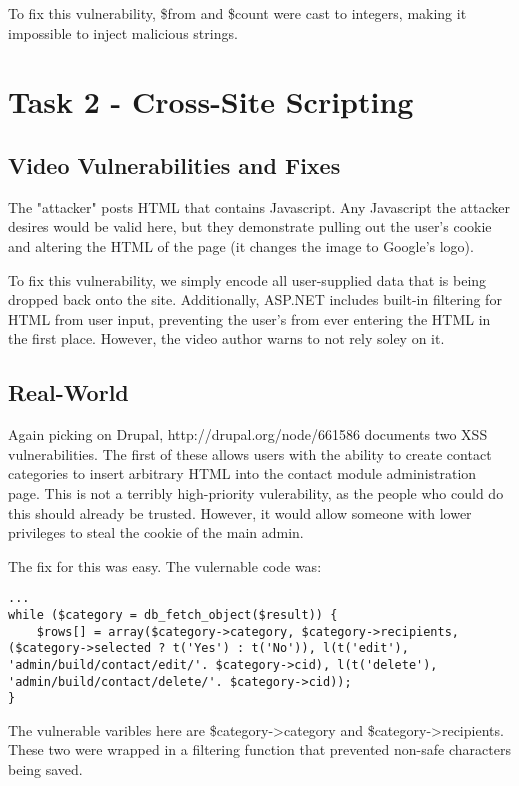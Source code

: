 \documentclass{article}
\begin{document}
\par To fix this vulnerability, \$from and \$count were cast to integers, making it impossible to inject malicious strings.

\section{Task 2 - Cross-Site Scripting}
\subsection{Video Vulnerabilities and Fixes}
\par The "attacker" posts HTML that contains Javascript. Any Javascript the attacker desires would be valid here, but they demonstrate pulling out the user's cookie and altering the HTML of the page (it changes the image to Google's logo).

\par To fix this vulnerability, we simply encode all user-supplied data that is being dropped back onto the site. Additionally, ASP.NET includes built-in filtering for HTML from user input, preventing the user's from ever entering the HTML in the first place. However, the video author warns to not rely soley on it.

\subsection{Real-World}
\par Again picking on Drupal, http://drupal.org/node/661586 documents two XSS vulnerabilities. The first of these allows users with the ability to create contact categories to insert arbitrary HTML into the contact module administration page. This is not a terribly high-priority vulerability, as the people who could do this should already be trusted. However, it would allow someone with lower privileges to steal the cookie of the main admin.

\par The fix for this was easy. The vulernable code was:
\begin{verbatim}
...
while ($category = db_fetch_object($result)) {
    $rows[] = array($category->category, $category->recipients, ($category->selected ? t('Yes') : t('No')), l(t('edit'), 'admin/build/contact/edit/'. $category->cid), l(t('delete'), 'admin/build/contact/delete/'. $category->cid));
}
\end{verbatim}

\par The vulnerable varibles here are \$category->category and \$category->recipients. These two were wrapped in a filtering function that prevented non-safe characters being saved.
\end{document}
